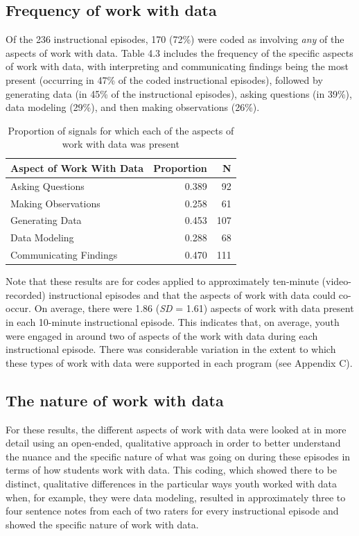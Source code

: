 \documentclass[]{book}
\theoremstyle{definition}
\theoremstyle{definition}
\theoremstyle{definition}
\theoremstyle{remark}
\begin{document}
\subsection{Frequency of work with
data}\label{frequency-of-work-with-data}

Of the 236 instructional episodes, 170 (72\%) were coded as involving
\emph{any} of the aspects of work with data. Table 4.3 includes the
frequency of the specific aspects of work with data, with interpreting
and communicating findings being the most present (occurring in 47\% of
the coded instructional episodes), followed by generating data (in 45\%
of the instructional episodes), asking questions (in 39\%), data
modeling (29\%), and then making observations (26\%).

\begin{table}

\caption{\label{tab:unnamed-chunk-9}Proportion of signals for which each of the aspects of work with data was present}
\centering
\begin{tabular}[t]{lrr}
\toprule
Aspect of Work With Data & Proportion & N\\
\midrule
Asking Questions & 0.389 & 92\\
Making Observations & 0.258 & 61\\
Generating Data & 0.453 & 107\\
Data Modeling & 0.288 & 68\\
Communicating Findings & 0.470 & 111\\
\bottomrule
\end{tabular}
\end{table}

Note that these results are for codes applied to approximately
ten-minute (video-recorded) instructional episodes and that the aspects
of work with data could co-occur. On average, there were 1.86 (\emph{SD}
= 1.61) aspects of work with data present in each 10-minute
instructional episode. This indicates that, on average, youth were
engaged in around two of aspects of the work with data during each
instructional episode. There was considerable variation in the extent to
which these types of work with data were supported in each program (see
Appendix C).

\subsection{The nature of work with
data}\label{the-nature-of-work-with-data}

For these results, the different aspects of work with data were looked
at in more detail using an open-ended, qualitative approach in order to
better understand the nuance and the specific nature of what was going
on during these episodes in terms of how students work with data. This
coding, which showed there to be distinct, qualitative differences in
the particular ways youth worked with data when, for example, they were
data modeling, resulted in approximately three to four sentence notes
from each of two raters for every instructional episode and showed the
specific nature of work with data.
\end{document}

